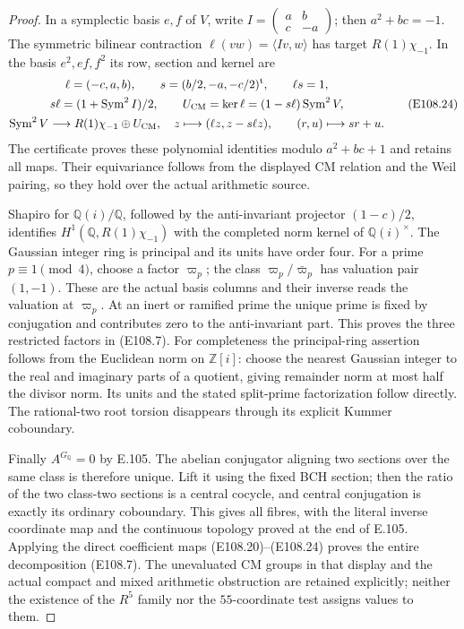 \begin{proof}
In a symplectic basis $e,f$ of $V$, write
$I=\left(\begin{smallmatrix}a&b\\c&-a\end{smallmatrix}\right)$;
then $a^2+bc=-1$.  The symmetric bilinear contraction
$\ell(vw)=\langle Iv,w\rangle$ has target
$R(1)\chi_{-1}$.  In the basis $e^2,ef,f^2$ its row,
section and kernel are
\[
 \begin{gathered}
 \ell=(-c,a,b),\qquad
 s=(b/2,-a,-c/2)^{\rm t},\qquad \ell s=1,\\
 s\ell=(1+\operatorname{Sym}^2I)/2,\qquad
 U_{\rm CM}=\ker\ell=(1-s\ell)\operatorname{Sym}^2V,\\
 \operatorname{Sym}^2V\longrightarrow
         R(1)\chi_{-1}\oplus U_{\rm CM},\quad
 z\longmapsto(\ell z,z-s\ell z),\qquad
 (r,u)\longmapsto sr+u.
 \end{gathered}
 \tag{E108.24}
\]
The certificate proves these polynomial identities modulo
$a^2+bc+1$ and retains all maps.  Their equivariance follows
from the displayed CM relation and the Weil pairing, so
they hold over the actual arithmetic source.

Shapiro for $\mathbb Q(i)/\mathbb Q$, followed by the
anti-invariant projector $(1-c)/2$, identifies
$H^1(\mathbb Q,R(1)\chi_{-1})$ with the completed norm
kernel of $\mathbb Q(i)^\times$.  The Gaussian integer
ring is principal and its units have order four.
For a prime $p\equiv1\pmod4$, choose a factor $\varpi_p$;
the class $\varpi_p/\bar\varpi_p$ has valuation pair
$(1,-1)$.  These are the actual basis columns and their
inverse reads the valuation at $\varpi_p$.  At an inert or
ramified prime the unique prime is fixed by conjugation
and contributes zero to the anti-invariant part.
This proves the three restricted factors in (E108.7).
For completeness the principal-ring assertion follows
from the Euclidean norm on $\mathbb Z[i]$: choose the
nearest Gaussian integer to the real and imaginary parts
of a quotient, giving remainder norm at most half the
divisor norm.  Its units and the stated split-prime
factorization follow directly.  The rational-two root
torsion disappears through its explicit Kummer coboundary.

Finally $A^{G_{\mathbb Q}}=0$ by E.105.  The abelian
conjugator aligning two sections over the same class is
therefore unique.  Lift it using the fixed BCH section;
then the ratio of the two class-two sections is a central
cocycle, and central conjugation is exactly its ordinary
coboundary.  This gives all fibres, with the literal
inverse coordinate map and the continuous topology proved
at the end of E.105.  Applying the direct coefficient maps
(E108.20)--(E108.24) proves the entire decomposition
(E108.7).  The unevaluated CM groups in that display and
the actual compact and mixed arithmetic obstruction are
retained explicitly; neither the existence of the
$R^5$ family nor the $55$-coordinate test assigns values
to them.
\end{proof}
